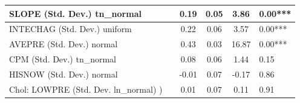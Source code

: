 \begin{table}
\begin{center}
\begin{tabular}{|l|l|c|c|c|l|}
			\hline
			SLOPE (Std. Dev.) tn_normal &  & 0.19 & 0.05 & 3.86 & 0.00*** \\
			\hline
			INTECHAG (Std. Dev.) uniform &  & 0.22 & 0.06 & 3.57 & 0.00*** \\
			\hline
			AVEPRE (Std. Dev.) normal &  & 0.43 & 0.03 & 16.87 & 0.00*** \\
			\hline
			CPM (Std. Dev.) tn_normal &  & 0.08 & 0.06 & 1.44 & 0.15 \\
			\hline
			HISNOW (Std. Dev.) normal &  & -0.01 & 0.07 & -0.17 & 0.86 \\
			\hline
			 Chol: LOWPRE (Std. Dev. ln_normal) ) &  & 0.01 & 0.07 & 0.11 & 0.91 \\
			\hline
		\end{tabular}
	\end{center}
\end{table}